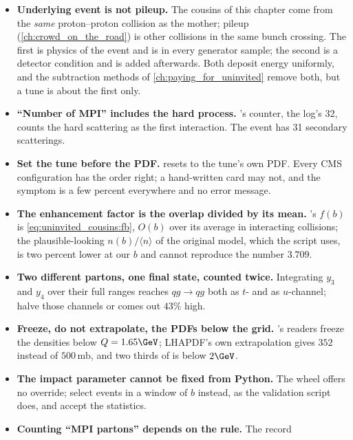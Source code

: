 \begin{pitfalls}
\begin{itemize}[nosep]
  \item \textbf{Underlying event is not pileup.} The cousins of this
    chapter come from the \emph{same} proton--proton collision as the
    mother; pileup (\cref{ch:crowd_on_the_road}) is other collisions in the
    same bunch crossing. The first is physics of the event and is in every
    generator sample; the second is a detector condition and is added
    afterwards. Both deposit energy uniformly, and the subtraction methods
    of \cref{ch:paying_for_uninvited} remove both, but a tune is about the
    first only.
  \item \textbf{``Number of MPI'' includes the hard process.} \PYTHIA's
    counter, the \CMSSW log's $32$, counts the hard scattering as the first
    interaction. The event has 31 secondary scatterings.
  \item \textbf{Set the tune before the PDF.}  resets
     to the tune's own PDF. Every CMS configuration has the
    order right; a hand-written \PYTHIA card may not, and the symptom is a
    few percent everywhere and no error message.
  \item \textbf{The enhancement factor is the overlap divided by its
    mean.} \PYTHIA's $f(b)$ is \cref{eq:uninvited_cousins:fb}, $O(b)$ over
    its average in interacting collisions; the plausible-looking
    $n(b)/\langle n\rangle$ of the original model, which the script uses,
    is two percent lower at our $b$ and cannot reproduce the \CMSSW number
    $3.709$.
  \item \textbf{Two different partons, one final state, counted twice.}
    Integrating $y_3$ and $y_4$ over their full ranges reaches $qg\to qg$
    both as $t$- and as $u$-channel; halve those channels or \sigint comes
    out $43\%$ high.
  \item \textbf{Freeze, do not extrapolate, the PDFs below the grid.}
    \PYTHIA's readers freeze the densities below $Q=1.65\GeV$; LHAPDF's own
    extrapolation gives $352$ instead of $500\,\mathrm{mb}$, and two thirds
    of \sigint is below $2\GeV$.
  \item \textbf{The impact parameter cannot be fixed from Python.} The
     wheel offers no  override; select
    events in a window of $b$ instead, as the validation script does, and
    accept the statistics.
  \item \textbf{Counting ``MPI partons'' depends on the rule.} The record

\end{itemize}
\end{pitfalls}
